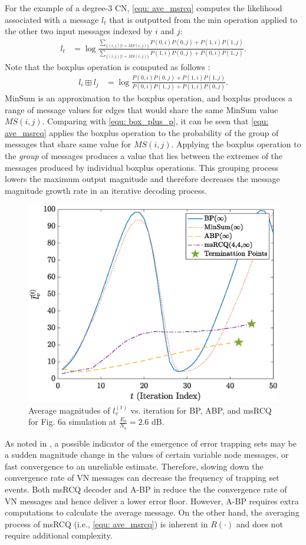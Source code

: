 \documentclass [PhD] {uclathes}
\begin{document}
 For the example of a degree-3 CN, \eqref{equ: ave_msrcq} computes the likelihood associated with a message $l_t$ that is outputted from the min operation applied to the other two input messages indexed by $i$ and $j$:
\begin{align}\label{equ: ave_msrcq}
    l_{t}&=\log\frac{\sum_{\{(i,j)|t=MS(i,j)\}}P(0,i)P(0,j)+P(1,i)P(1,j)}{\sum_{\{(i,j)|t=MS(i,j)\}}P(1,i)P(0,j)+P(0,i)P(1,j)}. 
\end{align}
Note that the boxplus operation is computed as follows :
\begin{align}
   l_i\boxplus l_j &=\log \frac{P(0,i)P(0,j)+P(1,i)P(1,j)}{P(0,i)P(1,j)+P(1,i)P(0,j)}\label{equ: box_plus_p}.
\end{align}
MinSum is an approximation to the boxplus operation, and boxplus produces a range of message values for edges that would share the same MinSum value $MS(i,j)$. 
Comparing with \eqref{equ: box_plus_p}, it can be seen that \eqref{equ: ave_msrcq} applies the boxplus operation to the probability of the group of messages that share same value for $MS(i,j)$. Applying the boxplus operation to the {\em group} of messages produces a value that lies between the extremes of the messages produced by individual boxplus operations.  This grouping process lowers the maximum output magnitude and therefore decreases the message magnitude growth rate in an iterative decoding process. 
\begin{figure}
	\centering
	\includegraphics[width=0.5\linewidth]{figures/80211_fig2.eps}
	\caption{Average magnitudes of $l^{(t)}_v$ vs. iteration for BP, ABP, \minsum and msRCQ for Fig.  6a simulation at  $\frac{E_b}{N_o}=2.6$ dB.
	}
	\label{fig: 80211_2}
\end{figure}
As noted in \cite{ABP}, a possible indicator of the emergence of error trapping sets may be a sudden magnitude change in the values of certain variable node messages, or fast convergence to an unreliable estimate. Therefore, slowing down the convergence rate of VN messages can decrease the frequency of trapping set events. Both msRCQ decoder and A-BP in \cite{ABP} reduce the the convergence rate of VN messages and hence deliver a lower error floor. However, A-BP requires extra computations to calculate the average message. On the other hand, the averaging process of msRCQ (i.e., \ref{equ: ave_msrcq}) is inherent in $R(\cdot)$ and does not require additional complexity. 
\end{document}

